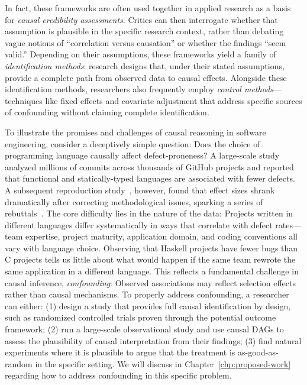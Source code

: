 In fact, these frameworks are often used together in applied research as a basis for \emph{causal credibility assessments}.
Critics can then interrogate whether that assumption is plausible in the specific research context, rather than debating vague notions of ``correlation versus causation'' or whether the findings ``seem valid.''
Depending on their assumptions, these frameworks yield a family of \emph{identification methods}: research designs that, under their stated assumptions, provide a complete path from observed data to causal effects.
Alongside these identification methods, researchers also frequently employ \emph{control methods}---techniques like fixed effects and covariate adjustment that address specific sources of confounding without claiming complete identification.

To illustrate the promises and challenges of causal reasoning in software engineering, consider a deceptively simple question: Does the choice of programming language causally affect defect-proneness?
A large-scale study~\cite{DBLP:conf/sigsoft/RayPFD14, DBLP:journals/cacm/RayPDF17} analyzed millions of commits across thousands of GitHub projects and reported that functional and statically-typed languages are associated with fewer defects.
A subsequent reproduction study~\cite{DBLP:journals/toplas/BergerHMVV19}, however, found that effect sizes shrank dramatically after correcting methodological issues, sparking a series of rebuttals~\cite{DBLP:journals/corr/abs-1911-07393, DBLP:journals/corr/abs-1911-11894}.
The core difficulty lies in the nature of the data: Projects written in different languages differ systematically in ways that correlate with defect rates---team expertise, project maturity, application domain, and coding conventions all vary with language choice.
Observing that Haskell projects have fewer bugs than C projects tells us little about what would happen if the same team rewrote the same application in a different language.
This reflects a fundamental challenge in causal inference, \emph{confounding}: Observed associations may reflect selection effects rather than causal mechanisms.
To properly address confounding, a researcher can either: (1) design a study that provides full causal identification by design, such as randomized controlled trials proven through the potential outcome framework; (2) run a large-scale observational study and use causal DAGs to assess the plausibility of causal interpretation from their findings; (3) find natural experiments where it is plausible to argue that the treatment is as-good-as-random in the specific setting.
We will discuss in Chapter~\ref{chp:proposed-work} regarding how to address confounding in this specific problem.

